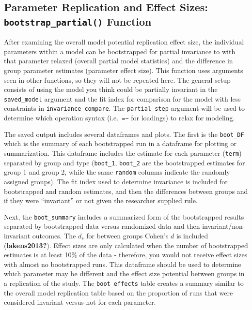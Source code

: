 \documentclass[
  man]{apa7}
\begin{document}
\subsection{\texorpdfstring{Parameter Replication and Effect Sizes: \texttt{bootstrap\_partial()} Function}{Parameter Replication and Effect Sizes: bootstrap\_partial() Function}}\label{parameter-replication-and-effect-sizes-bootstrap_partial-function}

After examining the overall model potential replication effect size, the individual parameters within a model can be bootstrapped for partial invariance to with that parameter relaxed (overall partial model statistics) and the difference in group parameter estimates (parameter effect size). This function uses arguments seen in other functions, so they will not be repeated here. The general setup consists of using the model you think could be partially invariant in the \texttt{saved\_model} argument and the fit index for comparison for the model with less constraints in \texttt{invariance\_compare}. The \texttt{partial\_step} argument will be used to determine which operation syntax (i.e.~\texttt{=\textasciitilde{}} for loadings) to relax for modeling.

The saved output includes several dataframes and plots. The first is the \texttt{boot\_DF} which is the summary of each bootstrapped run in a dataframe for plotting or summarization. This dataframe includes the estimate for each parameter (\texttt{term}) separated by group and type (\texttt{boot\_1}, \texttt{boot\_2} are the bootstrapped estimates for group 1 and group 2, while the same \texttt{random} columns indicate the randomly assigned groups). The fit index used to determine invariance is included for bootstrapped and random estimates, and then the differences between groups and if they were ``invariant'' or not given the researcher supplied rule.

Next, the \texttt{boot\_summary} includes a summarized form of the bootstrapped results separated by bootstrapped data versus randomized data and then invariant/non-invariant outcomes. The \(d_s\) for between groups Cohen's \(d\) is included (\textbf{lakens2013?}). Effect sizes are only calculated when the number of bootstrapped estimates is at least 10\% of the data - therefore, you would not receive effect sizes with almost no bootstrapped runs. This dataframe should be used to determine which parameter may be different and the effect size potential between groups in a replication of the study. The \texttt{boot\_effects} table creates a summary similar to the overall model replication table based on the proportion of runs that were considered invariant versus not for each parameter.
\end{document}
